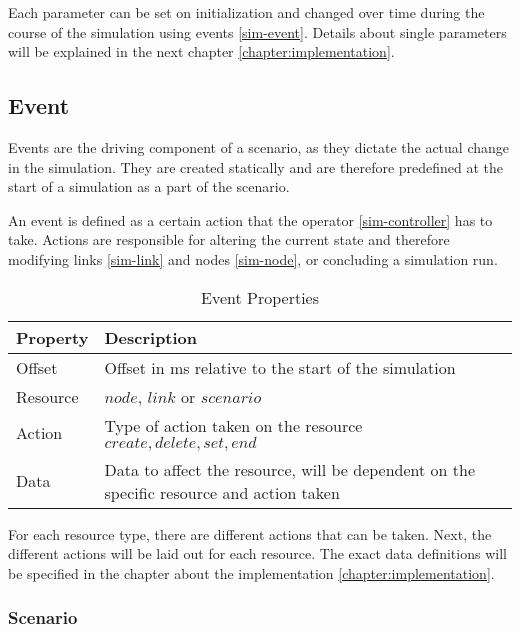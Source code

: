 Each parameter can be set on initialization and changed over time during the course of the simulation using events \ref{sim-event}. Details about single parameters will be explained in the next chapter \ref{chapter:implementation}.

\subsection{Event \label{sim-event}}

Events are the driving component of a scenario, as they dictate the actual change in the simulation. They are created statically and are therefore predefined at the start of a simulation as a part of the scenario.

An event is defined as a certain action that the operator \ref{sim-controller} has to take. Actions are responsible for altering the current state and therefore modifying links \ref{sim-link} and nodes \ref{sim-node}, or concluding a simulation run.


\begin{table}[H]
  \centering
  \begin{tabular}{ l|l }
    \label{table:properties-event}
    Property & Description                                                                              \\
    \hline
    Offset   & Offset in \si{\milli\second} relative to the start of the simulation                     \\
    Resource & $node$, $link$ or $scenario$                                                             \\
    Action   & Type of action taken on the resource ${create, delete, set, end}$                        \\
    Data     & Data to affect the resource, will be dependent on the specific resource and action taken \\
  \end{tabular}
  \caption{Event Properties}
\end{table}

For each resource type, there are different actions that can be taken. Next, the different actions will be laid out for each resource. The exact data definitions will be specified in the chapter about the implementation \ref{chapter:implementation}.
\subsubsection{Scenario}

